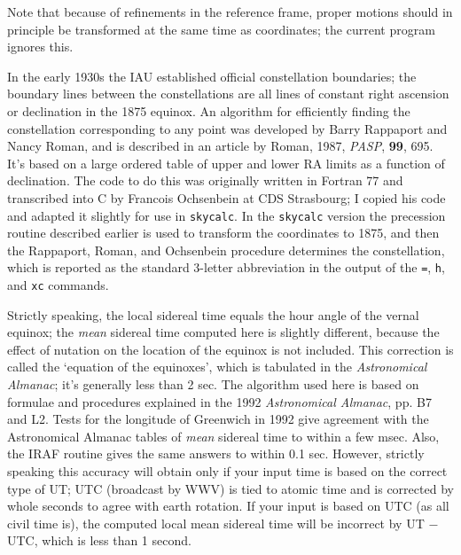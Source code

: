 Note that because of refinements in the reference frame, 
proper motions should in principle be transformed at the same time as
coordinates; the current
program ignores this.
\par
{}
\par
In the early 1930s the IAU established official constellation boundaries;
the boundary lines between the constellations are all lines of constant
right ascension or declination in the 1875 equinox.  
An algorithm for efficiently finding the 
constellation corresponding to any point was developed by Barry Rappaport
and Nancy Roman, and is described in an article by Roman, {1987, \it PASP}, 
{\bf 99}, 695.  It's based on a large ordered table of upper and lower
RA limits as a function of declination.  The code to do this was originally
written in Fortran 77 and transcribed into C by Francois Ochsenbein at
CDS Strasbourg; I copied his code and adapted it slightly for use
in {\tt skycalc}.  In the {\tt skycalc} version the precession routine
described earlier is used to transform the coordinates to 1875, and then 
the Rappaport, Roman, and Ochsenbein procedure determines the constellation,
which is reported as the standard 3-letter abbreviation in the output of
the {\tt =}, {\tt h}, and {\tt xc} commands.
\par
{}
\par
Strictly speaking, the local sidereal time equals the hour angle of the 
vernal equinox; the {\it mean} sidereal time computed here is slightly 
different, because the effect of nutation on the location of the equinox 
is not included.  This correction is called the `equation of the equinoxes', 
which is tabulated in the {\it Astronomical Almanac}; it's generally 
less than 2 sec. The algorithm used here is based on formulae and 
procedures explained in the 1992  {\it Astronomical Almanac}, pp. B7 and L2.
Tests for the longitude of Greenwich in 1992 give agreement with the 
Astronomical Almanac tables of {\it mean} sidereal time to within a few msec. 
Also, the IRAF routine gives the same answers to within 0.1 sec.  However,
strictly speaking this accuracy will obtain only if your input time is based 
on the correct type of UT; UTC (broadcast by WWV) is tied to atomic time
and is corrected by whole seconds to agree with earth rotation.  If your 
input is based on UTC (as all civil time is), the computed local mean 
sidereal time will be incorrect by UT $-$ UTC, which is less than 1 second.
\par
